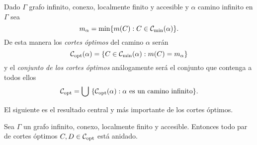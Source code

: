 \documentclass[tesis.tex]{subfiles}
\begin{document}
\begin{deff}
	Dado $\Gamma$ grafo infinito, conexo, localmente finito y accesible y $\alpha$ camino infinito en $\Gamma$ sea
	\[
		m_\alpha = \min \{ m(C) : C \in {\cal C}_{\text{min}}(\alpha) \}.
	\]
	De esta manera los \emph{cortes óptimos} del camino $\alpha$ serán
	\[
		{\cal C}_{\text{opt}}(\alpha) = \{ C \in {\cal C}_{\text{min}}(\alpha) : m(C) = m_\alpha  \}
	\]
	y el \emph{conjunto de los cortes óptimos} análogamente será el conjunto que contenga a todos ellos
	\[
		{\cal C}_{\text{opt}} = \bigcup \ \{ {\cal C}_{\text{opt}}(\alpha) : \alpha \ \text{es un camino infinito}  \}.
	\]
\end{deff}








El siguiente es el resultado central y más importante de los cortes óptimos.

\begin{teo}\label{teo_copt_anidados}
	Sea $\Gamma$ un grafo infinito, conexo, localmente finito y accesible.
	Entonces todo par de cortes óptimos $C,D \in {\cal C}_{\text{opt}}$ está anidado.
\end{teo}
\end{document}
